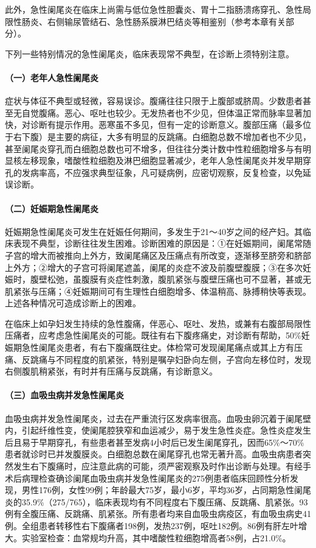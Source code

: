 此外，急性阑尾炎在临床上尚需与低位急性胆囊炎、胃十二指肠溃疡穿孔、急性局限性肠炎、右侧输尿管结石、急性肠系膜淋巴结炎等相鉴别（参考本章有关部分）。

下列一些特别情况的急性阑尾炎，临床表现常不典型，在诊断上须特别注意。

\paragraph{（一）老年人急性阑尾炎}

症状与体征不典型或轻微，容易误诊。腹痛往往只限于上腹部或脐周。少数患者甚至无自觉腹痛。恶心、呕吐也较少。无发热者也不少见，但体温正常而脉率显著加快，对诊断有提示作用。恶寒虽不多见，但有一定的诊断意义。腹部压痛（最多位于右下腹）是主要的病征，大多有明显的反跳痛。白细胞总数不增加者也不少见，甚至阑尾炎穿孔而白细胞总数也可不增多，但往往分类计数中性粒细胞增多与有明显核左移现象，嗜酸性粒细胞及淋巴细胞显著减少，老年人急性阑尾炎并发早期穿孔的发病率高，不应强求典型征象，凡可疑病例，应密切观察，反复检查，以免延误诊断。

\paragraph{（二）妊娠期急性阑尾炎}

妊娠期急性阑尾炎可发生在妊娠任何期间，多发生于21～40岁之间的经产妇。其临床表现不典型，诊断往往发生困难。诊断困难的原因是：①在妊娠期间，阑尾常随子宫的增大而被推向上外方，致阑尾痛区及压痛点有所改变，逐渐移至脐旁和脐部上外方；②增大的子宫可将阑尾遮盖，阑尾的炎症不波及前腹壁腹膜；③在多次妊娠时，腹壁松弛，虽腹膜有炎症性刺激，腹肌紧张与腹壁压痛也可不显著，甚或无肌紧张与压痛；④妊娠期间可有生理性白细胞增多、体温稍高、脉搏稍快等表现。上述各种情况可造成诊断上的困难。

在临床上如孕妇发生持续的急性腹痛，伴恶心、呕吐、发热，或兼有右腹部局限性压痛者，应考虑急性阑尾炎的可能。既往有右下腹疼痛史，对诊断有帮助，50\%妊娠期急性阑尾炎患者，有右下腹痛既往史。体检常可发现阑尾痛点或其上方有压痛、反跳痛与不同程度的肌紧张，特别是嘱孕妇卧向左侧，子宫向左移位时，发现右侧腹肌稍紧张，有时并有压痛与反跳痛，有诊断意义。

\paragraph{（三）血吸虫病并发急性阑尾炎}

血吸虫病并发急性阑尾炎，过去在严重流行区发病率很高。血吸虫卵沉着于阑尾壁内，引起纤维性变，使阑尾腔狭窄和血运减少，易于发生急性炎症。急性炎症发生后且易于早期穿孔，有些患者甚至发病4小时后已发生阑尾穿孔，因而65\%～70\%患者就诊时已并发腹膜炎。白细胞总数在阑尾穿孔也常无著升高。血吸虫病患者突然发生右下腹痛时，应注意此病的可能，须严密观察及时作出诊断与处理。有经手术后病理检查确诊阑尾血吸虫病并发急性阑尾炎的275例患者临床回顾性分析发现，男性176例，女性99例；年龄最大75岁，最小6岁，平均36岁，占同期急性阑尾炎的35.9\%（275/765），临床表现均有不同程度右下腹压痛、反跳痛、肌紧张。93例有全腹压痛、反跳痛、肌紧张。所有患者均来自血吸虫病疫区，有血吸虫病史41例。全组患者转移性右下腹痛者198例，发热237例，呕吐182例。86例有肝左叶增大。实验室检查：血常规均升高，其中嗜酸性粒细胞增高者58例，占21.0\%。

